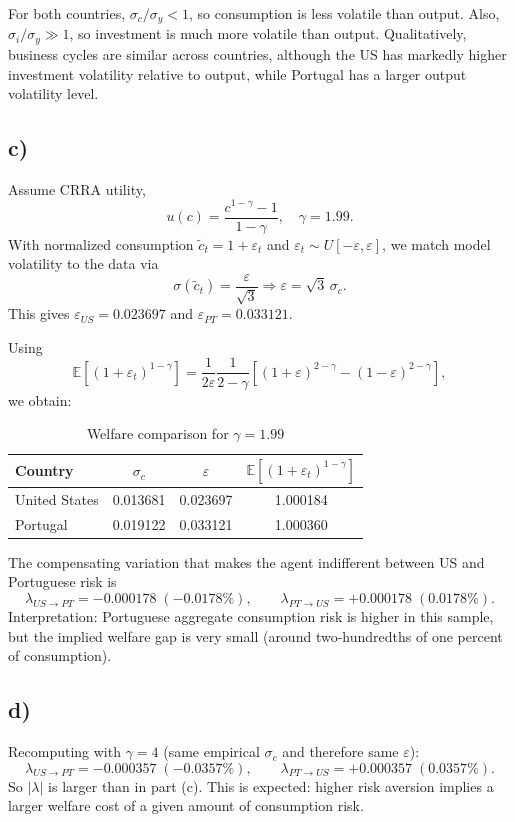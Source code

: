 \documentclass[12pt]{article}
\begin{document}
For both countries, $\sigma_c/\sigma_y<1$, so consumption is less volatile than output. Also, $\sigma_i/\sigma_y\gg 1$, so investment is much more volatile than output. Qualitatively, business cycles are similar across countries, although the US has markedly higher investment volatility relative to output, while Portugal has a larger output volatility level.

\subsection{c)}

Assume CRRA utility,
$$
u(c)=\frac{c^{1-\gamma}-1}{1-\gamma}, \quad \gamma=1.99.
$$
With normalized consumption $\tilde c_t=1+\varepsilon_t$ and $\varepsilon_t\sim U[-\varepsilon,\varepsilon]$, we match model volatility to the data via
$$
\sigma(\tilde c_t)=\frac{\varepsilon}{\sqrt{3}} \Rightarrow \varepsilon=\sqrt{3}\,\sigma_c.
$$
This gives $\varepsilon_{US}=0.023697$ and $\varepsilon_{PT}=0.033121$.

Using
$$
\mathbb{E}\left[(1+\varepsilon_t)^{1-\gamma}\right]
=\frac{1}{2\varepsilon}\frac{1}{2-\gamma}\left[(1+\varepsilon)^{2-\gamma}-(1-\varepsilon)^{2-\gamma}\right],
$$
we obtain:
\begin{table}[H]
\centering
\caption{Welfare comparison for $\gamma=1.99$}
\label{tab:ex1c}
\begin{tabular}{lccc}
\toprule
Country & $\sigma_c$ & $\varepsilon$ & $\mathbb{E}[(1+\varepsilon_t)^{1-\gamma}]$ \\
\midrule
United States & 0.013681 & 0.023697 & 1.000184 \\
Portugal      & 0.019122 & 0.033121 & 1.000360 \\
\bottomrule
\end{tabular}
\end{table}

The compensating variation that makes the agent indifferent between US and Portuguese risk is
$$
\lambda_{US\to PT}=-0.000178 \;(-0.0178\%), \qquad
\lambda_{PT\to US}=+0.000178 \;(0.0178\%).
$$
Interpretation: Portuguese aggregate consumption risk is higher in this sample, but the implied welfare gap is very small (around two-hundredths of one percent of consumption).

\subsection{d)}

Recomputing with $\gamma=4$ (same empirical $\sigma_c$ and therefore same $\varepsilon$):
$$
\lambda_{US\to PT}=-0.000357 \;(-0.0357\%), \qquad
\lambda_{PT\to US}=+0.000357 \;(0.0357\%).
$$
So $|\lambda|$ is larger than in part (c). This is expected: higher risk aversion implies a larger welfare cost of a given amount of consumption risk.
\end{document}
